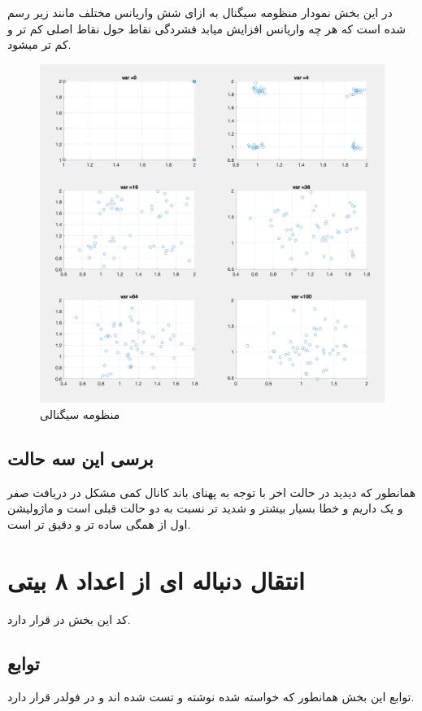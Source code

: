 \documentclass[10pt]{article}
\begin{document}
	\subsubsection{}
	در این بخش نمودار منظومه سیگنال به ازای شش واریانس مختلف مانند زیر رسم شده است که هر چه واریانس افزایش میابد فشردگی نقاط حول نقاط اصلی کم تر و کم تر میشود.
	\begin{figure}[H]
		\centering
		\includegraphics[width=0.8\linewidth]{../img/3.3.11}
		\caption{منظومه سیگنالی}
		\label{fig:3-3-11}
	\end{figure}

	\subsection{برسی این سه حالت}
	همانطور که دیدید در حالت اخر با توجه به پهنای باند کانال کمی مشکل در دریافت صفر و یک داریم و خطا بسیار بیشتر و شدید تر نسبت به دو حالت قبلی است و ماژولیشن اول از همگی ساده تر و دقیق تر است.
	
	\newpage
	\section{انتقال دنباله ای از اعداد ۸ بیتی}
	کد این بخش در 
	قرار دارد.
	
	\subsection{توابع}
	توابع این بخش همانطور که خواسته شده نوشته و تست شده اند و در فولدر 
	قرار دارد.
\end{document}
